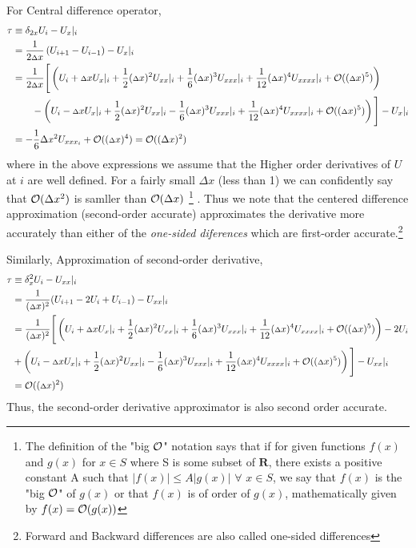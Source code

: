 For Central difference operator,
\begin{align*}
    \tau &\equiv \delta _ {2x} U_ i - {U_ x}|_ i \\
    &= \frac{1}{{2 {\scriptstyle \Delta} } x}\left( U_ {i+1} - U_{i-1}\right) - {U_ x}|_i \\
    &= \frac{1}{2 {\scriptstyle \Delta}  x}\Bigg[ \left( U_ i + {\scriptstyle \Delta} x{U_ x}|_ i + \frac{1}{2}({\scriptstyle \Delta} x)^2{U_{xx}}|_ i + \frac{1}{6}({\scriptstyle \Delta} x)^3{U_{xxx}}|_ i + \frac{1}{12}({\scriptstyle \Delta} x)^4{U_{xxxx}}|_ i + \mathcal{O}(({\scriptstyle \Delta} x)^5)\right) \\
    &\qquad - \left( U_ i - {\scriptstyle \Delta} x{U_ x}|_ i + \frac{1}{2}({\scriptstyle \Delta} x)^2{U_{xx}}|_ i - \frac{1}{6}({\scriptstyle \Delta} x)^3{U_{xxx}}|_ i + \frac{1}{12}({\scriptstyle \Delta} x)^4{U_{xxxx}}|_ i +\mathcal{O}(({\scriptstyle \Delta} x)^5)\right)\Bigg] - {U_ x}|_ i \\
    &= -\frac{1}{6}\Delta x^2 U_{xxx_ i} + \mathcal{O}(({\scriptstyle \Delta} x)^4) = \mathcal{O}((\Delta x)^2)
\end{align*}
where in the above expressions we assume that the Higher order derivatives of $U$ at $i$ are well defined. For a fairly small $\Delta x$ (less than 1) we can confidently say that $\mathcal{O}(\Delta x^2)$ is samller than $\mathcal{O}(\Delta x)$%
\footnote{The definition of the "big $\mathcal{O}$" notation says that if for given functions $f(x)$ and $g(x)$ for $x \in S$ where S is some subset of $\mathbf{R}$, there exists a positive constant A such that $|f(x)| \leq A|g(x)|$ $\forall$ $x \in S$, we say that $f(x)$ is the "big $\mathcal{O}$" of $g(x)$ or that $f(x)$ is of order of $g(x)$, mathematically given by $f(x) = \mathcal{O}(g(x))$}%
. Thus we note that the centered difference approximation (second-order accurate) approximates the derivative more accurately than either of the \textit{one-sided diferences} which are first-order accurate.\footnote{Forward and Backward differences are also called one-sided differences}

Similarly, Approximation of second-order derivative,
\begin{align*}
    \tau &\equiv \delta^2_x U_i - U_{xx}|_i \\
     &= \frac{1}{({\scriptstyle \Delta} x)^2}(U_{i+1}-2 U_i + U_{i-1})  - U_{xx}|_i \\
     &= \frac{1}{({\scriptstyle \Delta} x)^2}\Bigg[ \left( U_ i + {\scriptstyle \Delta} x{U_ x}|_ i + \frac{1}{2}({\scriptstyle \Delta} x)^2{U_{xx}}|_ i + \frac{1}{6}({\scriptstyle \Delta} x)^3{U_{xxx}}|_ i + \frac{1}{12}({\scriptstyle \Delta} x)^4{U_{xxxx}}|_ i + \mathcal{O}(({\scriptstyle \Delta} x)^5)\right) - 2 U_i\\
    & + \left( U_ i - {\scriptstyle \Delta} x{U_ x}|_ i + \frac{1}{2}({\scriptstyle \Delta} x)^2{U_{xx}}|_ i - \frac{1}{6}({\scriptstyle \Delta} x)^3{U_{xxx}}|_ i + \frac{1}{12}({\scriptstyle \Delta} x)^4{U_{xxxx}}|_ i +\mathcal{O}(({\scriptstyle \Delta} x)^5)\right)\Bigg] - {U_ {xx}}|_ i \\
    &= \mathcal{O}(({\scriptstyle \Delta} x)^2)
\end{align*}
Thus, the second-order derivative approximator is also second order accurate.

